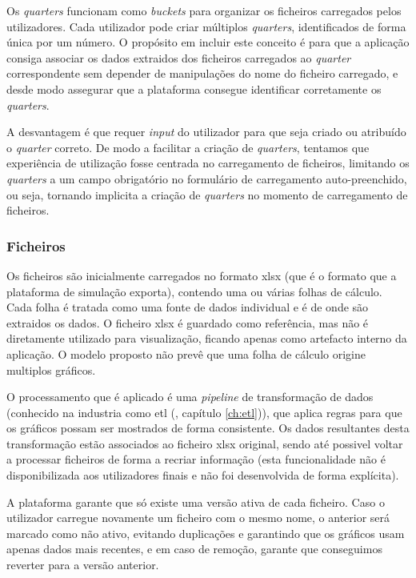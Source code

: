 Os \textit{quarters} funcionam como \textit{buckets} para organizar os ficheiros carregados pelos utilizadores. Cada utilizador pode criar múltiplos \textit{quarters}, identificados de forma única por um número. O propósito em incluir este conceito é para que a aplicação consiga associar os dados extraidos dos ficheiros carregados ao \textit{quarter} correspondente sem depender de manipulações do nome do ficheiro carregado, e desde modo assegurar que a plataforma consegue identificar corretamente os \textit{quarters}. 

A desvantagem é que requer \textit{input} do utilizador para que seja criado ou atribuído o \textit{quarter} correto. De modo a facilitar a criação de \textit{quarters}, tentamos que experiência de utilização fosse centrada no carregamento de ficheiros, limitando os \textit{quarters} a um campo obrigatório no formulário de carregamento auto-preenchido, ou seja, tornando implicita a criação de \textit{quarters} no momento de carregamento de ficheiros.

\subsubsection{Ficheiros}

Os ficheiros são inicialmente carregados no formato \gls{xlsx} (que é o formato que a plataforma de simulação exporta), contendo uma ou várias folhas de cálculo. Cada folha é tratada como uma fonte de dados individual e é de onde são extraidos os dados. O ficheiro \gls{xlsx} é guardado como referência, mas não é diretamente utilizado para visualização, ficando apenas como artefacto interno da aplicação. O modelo proposto não prevê que uma folha de cálculo origine multiplos gráficos.

O processamento que é aplicado é uma \textit{pipeline} de transformação de dados (conhecido na industria como \gls{etl} (\cf, capítulo \ref{ch:etl})), que aplica regras para que os gráficos possam ser mostrados de forma consistente. Os dados resultantes desta transformação estão associados ao ficheiro \gls{xlsx} original, sendo até possivel voltar a processar ficheiros de forma a recriar informação (esta funcionalidade não é disponibilizada aos utilizadores finais e não foi desenvolvida de forma explícita).

A plataforma garante que só existe uma versão ativa de cada ficheiro. Caso o utilizador carregue novamente um ficheiro com o mesmo nome, o anterior será marcado como não ativo, evitando duplicações e garantindo que os gráficos usam apenas dados mais recentes, e em caso de remoção, garante que conseguimos reverter para a versão anterior.

